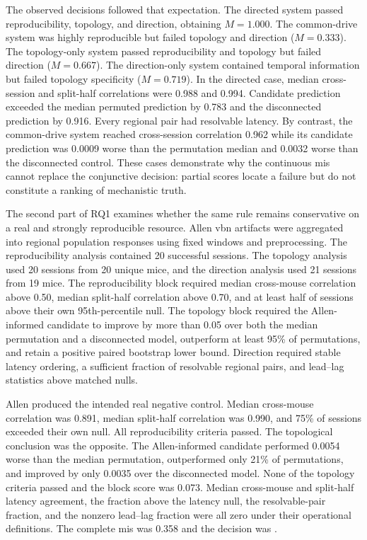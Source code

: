 The observed decisions followed that expectation. The directed system passed
reproducibility, topology, and direction, obtaining $M=1.000$. The common-drive
system was highly reproducible but failed topology and direction
($M=0.333$). The topology-only system passed reproducibility and topology but
failed direction ($M=0.667$). The direction-only system contained temporal
information but failed topology specificity ($M=0.719$). In the directed case,
median cross-session and split-half correlations were 0.988 and 0.994. Candidate
prediction exceeded the median permuted prediction by 0.783 and the
disconnected prediction by 0.916. Every regional pair had resolvable
latency. By contrast, the common-drive system reached cross-session correlation
0.962 while its candidate prediction was 0.0009 worse than the permutation
median and 0.0032 worse than the disconnected control. These cases demonstrate
why the continuous \acs{mis} cannot replace the conjunctive decision: partial scores
locate a failure but do not constitute a ranking of mechanistic truth.

The second part of RQ1 examines whether the same rule remains conservative on a
real and strongly reproducible resource. Allen \ac{vbn}
artifacts were aggregated into regional population responses using fixed
windows and preprocessing. The reproducibility analysis contained 20 successful
sessions. The topology analysis used 20 sessions from 20 unique mice, and the
direction analysis used 21 sessions from 19 mice. The reproducibility block
required median cross-mouse correlation above 0.50, median split-half
correlation above 0.70, and at least half of sessions above their own
95th-percentile null. The topology block required the Allen-informed candidate
to improve by more than 0.05 over both the median permutation and a disconnected
model, outperform at least 95\% of permutations, and retain a positive paired
bootstrap lower bound. Direction required stable latency ordering, a sufficient
fraction of resolvable regional pairs, and lead--lag statistics above matched
nulls.

Allen produced the intended real negative control. Median cross-mouse
correlation was 0.891, median split-half correlation was 0.990, and 75\% of
sessions exceeded their own null. All reproducibility criteria passed. The
topological conclusion was the opposite. The Allen-informed candidate performed
0.0054 worse than the median permutation, outperformed only 21\% of
permutations, and improved by only 0.0035 over the disconnected model. None of
the topology criteria passed and the block score was 0.073. Median cross-mouse
and split-half latency agreement, the fraction above the latency null, the
resolvable-pair fraction, and the nonzero lead--lag fraction were all zero under
their operational definitions. The complete \acs{mis} was 0.358 and the decision was
.


